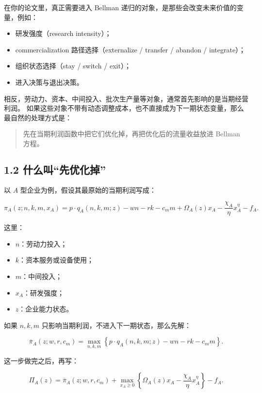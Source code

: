 \documentclass[12pt]{ctexart}
\begin{document}
在你的论文里，真正需要进入 Bellman 递归的对象，是那些会改变未来价值的变量，例如：

\begin{itemize}[leftmargin=2em]
    \item 研发强度（research intensity）；
    \item commercialization 路径选择（externalize / transfer / abandon / integrate）；
    \item 组织状态选择（stay / switch / exit）；
    \item 进入决策与退出决策。
\end{itemize}

相反，劳动力、资本、中间投入、批次生产量等对象，通常首先影响的是当期经营利润。
如果这些对象不带有动态调整成本，也不直接成为下一期状态变量，那么最自然的处理方式是：

\begin{quote}
先在当期利润函数中把它们优化掉，再把优化后的流量收益放进 Bellman 方程。
\end{quote}

\subsection{1.2 什么叫“先优化掉”}

以 \(A\) 型企业为例，假设其最原始的当期利润写成：

\[
\pi_A(z;n,k,m,x_A)
=
p\cdot q_A(n,k,m;z)
-wn-rk-c_m m
+\Omega_A(z)x_A
-\frac{\chi_A}{\eta}x_A^\eta
-f_A.
\]

这里：

\begin{itemize}[leftmargin=2em]
    \item \(n\)：劳动力投入；
    \item \(k\)：资本服务或设备使用；
    \item \(m\)：中间投入；
    \item \(x_A\)：研发强度；
    \item \(z\)：企业能力状态。
\end{itemize}

如果 \(n,k,m\) 只影响当期利润，不进入下一期状态，那么先解：

\[
\bar{\pi}_A(z;w,r,c_m)
=
\max_{n,k,m}
\left\{
p\cdot q_A(n,k,m;z)-wn-rk-c_m m
\right\}.
\]

这一步做完之后，再写：

\[
\Pi_A(z)
=
\bar{\pi}_A(z;w,r,c_m)
+
\max_{x_A\ge 0}
\left\{
\Omega_A(z)x_A-\frac{\chi_A}{\eta}x_A^\eta
\right\}
-f_A.
\]
\end{document}
